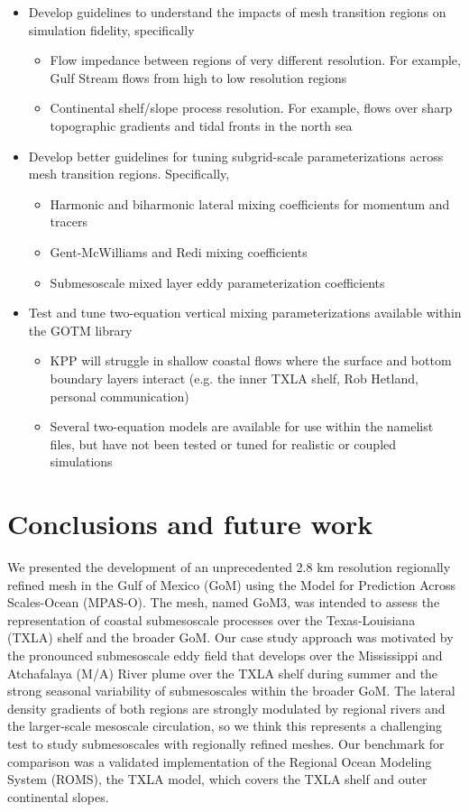 \begin{itemize}
\begin{itemize}
    \end{itemize}
    \item Develop guidelines to understand the impacts of mesh transition regions on simulation fidelity, specifically
    \begin{itemize}
        \item Flow impedance between regions of very different resolution. For example, Gulf Stream flows from high to low resolution regions
        \item Continental shelf/slope process resolution. For example, flows over sharp topographic gradients and tidal fronts in the north sea 
    \end{itemize}
    \item Develop better guidelines for tuning subgrid-scale parameterizations across mesh transition regions. Specifically, 
    \begin{itemize}
        \item Harmonic and biharmonic lateral mixing coefficients for momentum and tracers
        \item Gent-McWilliams and Redi mixing coefficients 
        \item Submesoscale mixed layer eddy parameterization coefficients
    \end{itemize}
    \item Test and tune two-equation vertical mixing parameterizations available within the GOTM library
    \begin{itemize}
        \item KPP will struggle in shallow coastal flows where the surface and bottom boundary layers interact (e.g. the inner TXLA shelf, Rob Hetland, personal communication)
        \item Several two-equation models are available for use within the namelist files, but have not been tested or tuned for realistic or coupled simulations
    \end{itemize}
\end{itemize}

\section{Conclusions and future work}
We presented the development of an unprecedented 2.8 km resolution regionally refined mesh in the Gulf of Mexico (GoM) using the Model for Prediction Across Scales-Ocean (MPAS-O). The mesh, named GoM3, was intended to assess the representation of coastal submesoscale processes over the Texas-Louisiana (TXLA) shelf and the broader GoM. Our case study approach was motivated by the pronounced submesoscale eddy field that develops over the Mississippi and Atchafalaya (M/A) River plume over the TXLA shelf during summer and the strong seasonal variability of submesoscales within the broader GoM. The lateral density gradients of both regions are strongly modulated by regional rivers and the larger-scale mesoscale circulation, so we think this represents a challenging test to study submesoscales with regionally refined meshes. Our benchmark for comparison was a validated implementation of the Regional Ocean Modeling System (ROMS), the TXLA model, which covers the TXLA shelf and outer continental slopes. 

